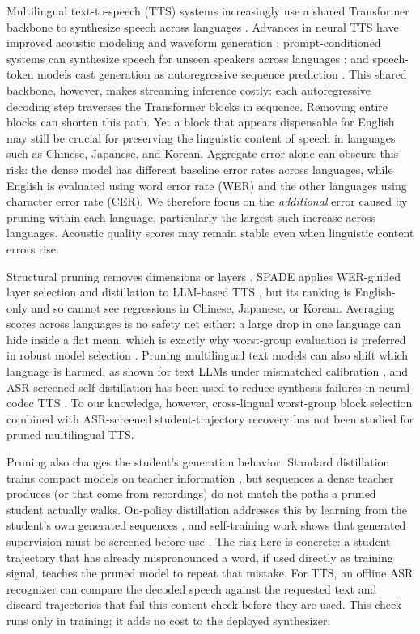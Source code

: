 \documentclass{article}
\begin{document}
Multilingual text-to-speech (TTS) systems increasingly use a shared
Transformer backbone to synthesize speech across languages
\cite{du2024cosyvoice,du2025cosyvoice3}. Advances in neural TTS have
improved acoustic modeling and waveform generation
\cite{shen2018naturaltts}; prompt-conditioned systems can synthesize
speech for unseen speakers across languages
\cite{casanova2022yourtts,le2023voicebox}; and speech-token models
cast generation as autoregressive sequence prediction
\cite{wang2023neuralcodec,kharitonov2023speak}. This shared backbone,
however, makes streaming inference costly: each autoregressive
decoding step traverses the Transformer blocks in sequence.
Removing entire blocks can shorten this path. Yet a block that
appears dispensable for English may still be crucial for preserving
the linguistic content of speech in languages such as Chinese,
Japanese, and Korean. Aggregate error alone can obscure this risk:
the dense model has different baseline error rates across languages,
while English is evaluated using word error rate (WER) and the other
languages using character error rate (CER). We therefore focus on the
\emph{additional} error caused by pruning within each language,
particularly the largest such increase across languages. Acoustic
quality scores may remain stable even when linguistic content errors
rise.

Structural pruning removes dimensions or layers
\cite{ma2023llmpruner,ashkboos2024slicegpt,men2025shortgpt}. SPADE applies
WER-guided layer selection and distillation to LLM-based TTS
\cite{nguyen2026spade}, but its ranking is English-only and so cannot see
regressions in Chinese, Japanese, or Korean. Averaging scores across languages
is no safety net either: a large drop in one language can hide inside a flat
mean, which is exactly why worst-group evaluation is preferred in robust model
selection \cite{sagawa2020dro}. Pruning multilingual text models can also
shift which language is harmed, as shown for text LLMs under mismatched
calibration \cite{kurz2026limitations}, and ASR-screened self-distillation
has been used to reduce synthesis failures in neural-codec TTS
\cite{asaria2026reliable}. To our knowledge, however, cross-lingual
worst-group block selection combined with ASR-screened student-trajectory
recovery has not been studied for pruned multilingual TTS.

Pruning also changes the student's generation behavior. Standard distillation
trains compact models on teacher information
\cite{hinton2015distilling,kim2016sequence}, but sequences a dense teacher
produces (or that come from recordings) do not match the paths a pruned
student actually walks. On-policy distillation addresses this by learning
from the student's own generated sequences
\cite{agarwal2024onpolicy}, and self-training work shows that generated
supervision must be screened before use \cite{park2020improved}. The risk
here is concrete: a student trajectory that has already mispronounced a
word, if used directly as training signal, teaches the pruned model to
repeat that mistake. For TTS, an offline ASR recognizer can compare the
decoded speech against the requested text and discard trajectories that
fail this content check before they are used. This check runs only in
training; it adds no cost to the deployed synthesizer.
\end{document}
